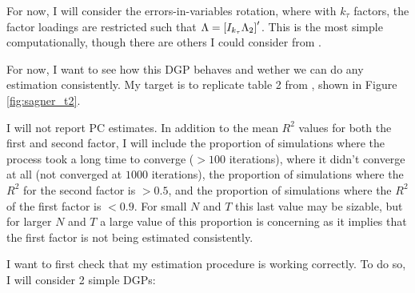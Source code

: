 \documentclass[12pt]{article}
\begin{document}
For now, I will consider the errors-in-variables rotation, where with $k_{\tau}$ factors, the factor loadings are restricted such that $\Lambda = \left[I_{k_{\tau}} \space \Lambda_2\right]^{\prime}$. This is the most simple computationally, though there are others I could consider from \citet{BaiNg2013}.

For now, I want to see how this DGP behaves and wether we can do any estimation consistently. My target is to replicate table 2 from \citet{Sagner2019}, shown in Figure \ref{fig:sagner_t2}.


I will not report PC estimates. In addition to the mean $R^2$ values for both the first and second factor, I will include the proportion of simulations where the process took a long time to converge ($> 100$ iterations), where it didn't converge at all (not converged at $1000$ iterations), the proportion of simulations where the $R^2$ for the second factor is $> 0.5$, and the proportion of simulations where the $R^2$ of the first factor is $< 0.9$. For small $N$ and $T$ this last value may be sizable, but for larger $N$ and $T$ a large value of this proportion is concerning as it implies that the first factor is not being estimated consistently.

I want to first check that my estimation procedure is working correctly. To do so, I will consider 2 simple DGPs:
\end{document}
